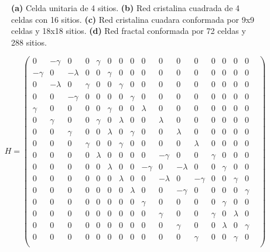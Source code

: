 \begin{figure}[h!]
        \caption{\textbf{(a)} Celda unitaria de 4 sitios. \textbf{(b)} Red cristalina cuadrada de 4 celdas con 16 sitios. \textbf{(c)} Red cristalina cuadara conformada por 9x9 celdas y 18x18 sitios. \textbf{(d)} Red fractal conformada por 72 celdas y 288 sitios. }
        \label{fig:Models}
\end{figure}
    \label{eq:BBH_Model_real}
    \begin{equation} 
         H = 
     \begin{pmatrix}
        0 & -\gamma & 0 & 0 & \gamma & 0 & 0 & 0 & 0 & 0 & 0 & 0 & 0 & 0 & 0 & 0 & \\
        -\gamma & 0 & -\lambda & 0 &0 & \gamma & 0 & 0 & 0 & 0 & 0 & 0 & 0 & 0 & 0 & 0  \\
        0 & -\lambda & 0 & \gamma & 0 & 0 & \gamma & 0& 0 & 0 & 0 & 0 & 0 & 0 & 0 & 0 \\
        0 & 0 & -\gamma & 0 & 0 & 0 & 0 & \gamma  & 0 & 0 & 0 & 0 & 0 & 0 & 0 & 0 \\
        
        \gamma & 0 & 0 & 0 & 0 & \gamma & 0 & 0 & \lambda & 0 & 0 & 0 & 0 & 0 & 0 & 0 \\
        0 & \gamma & 0 & 0 & \gamma & 0 & \lambda & 0 & 0 & \lambda & 0 & 0 & 0 & 0 & 0 & 0 \\
        0 & 0 & \gamma & 0 & 0 & \lambda & 0 & \gamma & 0 & 0 & \lambda & 0 & 0 & 0 & 0 & 0 \\
        0 & 0 & 0 & \gamma & 0 & 0 & \gamma & 0 & 0 & 0 & 0 & \lambda & 0 &0 & 0 & 0 \\
        
        0 & 0 & 0 & 0 & \lambda & 0 & 0 & 0 & 0 & -\gamma & 0 & 0 & \gamma &0 & 0 & 0 \\
        0 & 0 & 0 & 0 & 0 & \lambda & 0 & 0 & -\gamma & 0 & -\lambda &  0 & 0 & \gamma & 0 & 0 \\
        0 & 0 & 0 & 0 & 0 & 0 & \lambda & 0 & 0 & -\lambda & 0 & -\gamma  &0 & 0 & \gamma & 0 \\
        0 & 0 & 0 & 0 & 0 & 0 & 0 & \lambda & 0 & 0 & -\gamma & 0 & 0 &0 & 0 & \gamma \\
        
        0 & 0 & 0 & 0 & 0 & 0 & 0 & 0 & \gamma & 0 & 0 & 0 & 0 & \gamma & 0 & 0 \\
        0 & 0 & 0 & 0 & 0 & 0 & 0 & 0 & 0 & \gamma & 0 & 0 & \gamma & 0 & \lambda & 0  \\
        0 & 0 & 0 & 0 & 0 & 0 & 0 & 0 & 0 & 0 & \gamma & 0 & 0 & \lambda & 0 & \gamma \\
        0 & 0 & 0 & 0 & 0 & 0 & 0 & 0 & 0 & 0 & 0 & \gamma & 0 & 0 & \gamma & 0 \\
        
    \end{pmatrix}
    \end{equation}
    
